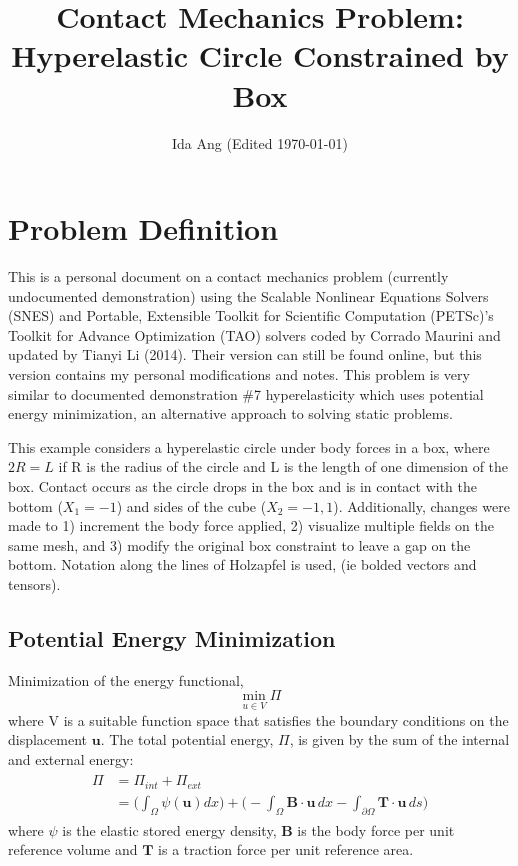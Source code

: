 \documentclass[12pt,3p]{article}
\begin{document}
\title{\Large{Contact Mechanics Problem: Hyperelastic Circle Constrained by Box} \vspace{-2ex}}
\author{Ida Ang (Edited \today)}
\date{\vspace{-5ex}}
\maketitle

\tableofcontents
\newpage

\section{Problem Definition}
\vspace{-2ex}
This is a personal document on a contact mechanics problem (currently undocumented demonstration) using the Scalable Nonlinear Equations Solvers (SNES) and Portable, Extensible Toolkit for Scientific Computation (PETSc)'s Toolkit for Advance Optimization (TAO) solvers coded by Corrado Maurini and updated by Tianyi Li (2014). Their version can still be found online, but this version contains my personal modifications and notes. This problem is very similar to documented demonstration \#7 hyperelasticity which uses potential energy minimization, an alternative approach to solving static problems.

This example considers a hyperelastic circle under body forces in a box, where $2R = L$ if R is the radius of the circle and L is the length of one dimension of the box. Contact occurs as the circle drops in the box and is in contact with the bottom ($X_1 = -1$) and sides of the cube ($X_2 = -1, 1$). Additionally, changes were made to 1) increment the body force applied, 2) visualize multiple fields on the same mesh, and 3) modify the original box constraint to leave a gap on the bottom. Notation along the lines of Holzapfel is used, (ie bolded vectors and tensors). 

\subsection{Potential Energy Minimization}

Minimization of the energy functional,
\[ \min_{u \in V} \Pi \]
where V is a suitable function space that satisfies the boundary conditions on the displacement $\mathbf{u}$. The total potential energy, $\Pi$, is given by the sum of the internal and external energy: 
\begin{align}\label{totPotEnergy}
\begin{split}
\Pi &= \Pi_{int} + \Pi_{ext} \\
	&= \bigg( \int_{\Omega} \psi(\mathbf{u}) dx \bigg) 
	+ \bigg( - \int_{\Omega} \mathbf{B} \cdot \mathbf{u} \, dx 
	- \int_{\partial \Omega} \mathbf{T} \cdot \mathbf{u} \, ds \bigg) 
\end{split}
\end{align}
where $\psi$ is the elastic stored energy density, $\mathbf{B}$ is the body force per unit reference volume and $\mathbf{T}$ is a traction force per unit reference area. 
\end{document}
